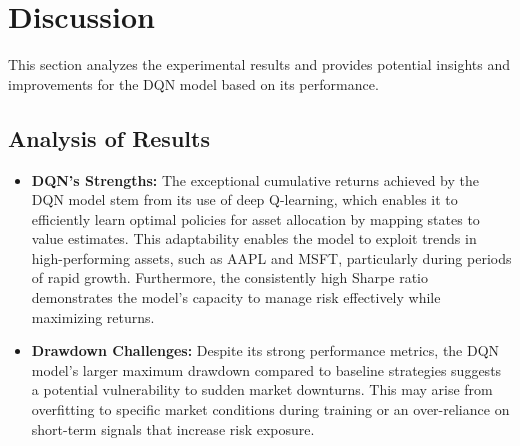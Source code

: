 \documentclass[conference]{IEEEtran}
\begin{document}
\section{Discussion}
This section analyzes the experimental results and provides potential insights and improvements for the DQN model based on its performance.

\subsection{Analysis of Results}
\begin{itemize}
  \item \textbf{DQN's Strengths:} The exceptional cumulative returns achieved by the DQN model stem from its use of deep Q-learning, which enables it to efficiently learn optimal policies for asset allocation by mapping states to value estimates. This adaptability enables the model to exploit trends in high-performing assets, such as AAPL and MSFT, particularly during periods of rapid growth. Furthermore, the consistently high Sharpe ratio demonstrates the model's capacity to manage risk effectively while maximizing returns.
  \item \textbf{Drawdown Challenges:} Despite its strong performance metrics, the DQN model's larger maximum drawdown compared to baseline strategies suggests a potential vulnerability to sudden market downturns. This may arise from overfitting to specific market conditions during training or an over-reliance on short-term signals that increase risk exposure.
\end{itemize}
\end{document}
